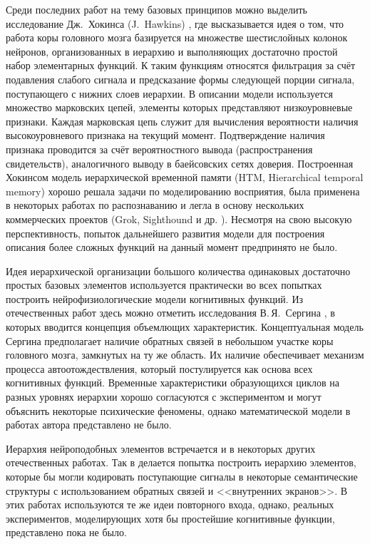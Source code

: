 Среди последних работ на тему базовых принципов можно выделить исследование Дж.~Хокинса (J.~Hawkins) \cite{Hawkins2009}, где высказывается идея о том, что работа коры головного мозга базируется на множестве шестислойных колонок нейронов, организованных в иерархию и выполняющих достаточно простой набор элементарных функций. К таким функциям относятся фильтрация за счёт подавления слабого сигнала и предсказание формы следующей порции сигнала, поступающего с нижних слоев иерархии. В описании модели используется множество марковских цепей, элементы которых представляют низкоуровневые признаки. Каждая марковская цепь служит для вычисления вероятности наличия высокоуровневого признака на текущий момент. Подтверждение наличия признака проводится за счёт вероятностного вывода (распространения свидетельств), аналогичного выводу в баейсовских сетях доверия. Построенная Хокинсом модель иерархической временной памяти (HTM, Hierarchical temporal memory) хорошо решала задачи по моделированию восприятия, была применена в некоторых работах по распознаванию \cite{Bolotova2011} и легла в основу нескольких коммерческих проектов (Grok, Sighthound и др. \cite{NUM2014}). Несмотря на свою высокую перспективность, попыток дальнейшего развития модели для построения описания более сложных функций на данный момент предпринято не было.

Идея иерархической организации большого количества одинаковых достаточно простых базовых элементов используется практически во всех попытках построить нейрофизиологические модели когнитивных функций. Из отечественных работ здесь можно отметить исследования В.\,Я.~Сергина \cite{Sergin2008,Sergin2009,Sergin2011}, в которых вводится концепция объемлющих характеристик. Концептуальная модель Сергина предполагает наличие обратных связей в небольшом участке коры головного мозга, замкнутых на ту же область. Их наличие обеспечивает механизм процесса автоотождествления, который постулируется как основа всех когнитивных функций. Временные характеристики образующихся циклов на разных уровнях иерархии хорошо согласуются с экспериментом и могут объяснить некоторые психические феномены, однако математической модели в работах автора представлено не было.

Иерархия нейроподобных элементов встречается и в некоторых других отечественных работах. Так в \cite{Vartanov2011,Chernavsky2012} делается попытка построить иерархию элементов, которые бы могли кодировать поступающие сигналы в некоторые семантические структуры с использованием обратных связей и <<внутренних экранов>>. В этих работах используются те же идеи повторного входа, однако, реальных экспериментов, моделирующих хотя бы простейшие когнитивные функции, представлено пока не было.

